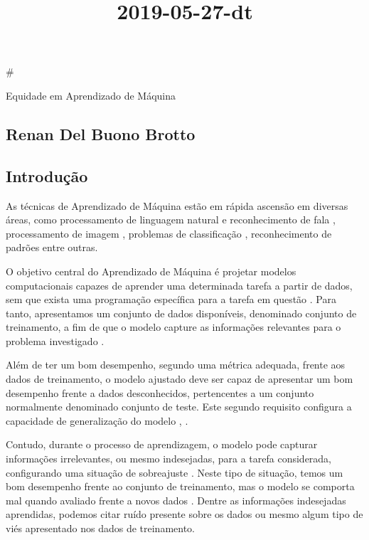 \documentclass[11pt]{article}
\title{2019-05-27-dt}
\begin{document}
    
    
    \maketitle
    
    

    
    \#

Equidade em Aprendizado de Máquina

\subsection{Renan Del Buono Brotto}\label{renan-del-buono-brotto}

\subsection{Introdução}\label{introduuxe7uxe3o}

As técnicas de Aprendizado de Máquina estão em rápida ascensão em
diversas áreas, como processamento de linguagem natural e reconhecimento
de fala \cite{Kamath2019}, processamento de imagem \cite{Cipolla2013},
problemas de classificação \cite{Duda2000}, reconhecimento de padrões
\cite{Bishop2006} entre outras.

O objetivo central do Aprendizado de Máquina é projetar modelos
computacionais capazes de aprender uma determinada tarefa a partir de
dados, sem que exista uma programação específica para a tarefa em
questão \cite{Samuel1959}. Para tanto, apresentamos um conjunto de dados
disponíveis, denominado conjunto de treinamento, a fim de que o modelo
capture as informações relevantes para o problema investigado
\cite{Hastie2009}.

Além de ter um bom desempenho, segundo uma métrica adequada, frente aos
dados de treinamento, o modelo ajustado deve ser capaz de apresentar um
bom desempenho frente a dados desconhecidos, pertencentes a um conjunto
normalmente denominado conjunto de teste. Este segundo requisito
configura a capacidade de generalização do modelo \cite{Bishop2006},
\cite{haykin-rn}.

Contudo, durante o processo de aprendizagem, o modelo pode capturar
informações irrelevantes, ou mesmo indesejadas, para a tarefa
considerada, configurando uma situação de sobreajuste \cite{haykin-rn}.
Neste tipo de situação, temos um bom desempenho frente ao conjunto de
treinamento, mas o modelo se comporta mal quando avaliado frente a novos
dados \cite{Bishop2006}. Dentre as informações indesejadas aprendidas,
podemos citar ruído presente sobre os dados \cite{Bishop2006} ou mesmo
algum tipo de viés apresentado nos dados de treinamento.
\end{document}
